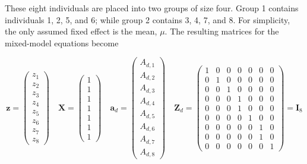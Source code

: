 \documentclass{article}
\begin{document}
These eight individuals are placed into two groups of size four. Group 1 contains individuals 1, 2, 5, and 6; while group 2 contains 3, 4, 7, and 8. For simplicity, the only assumed fixed effect is the mean,  $ \mu $. The resulting matrices for the mixed-model equations become

\begin{equation}
\mathbf{z}=\begin{pmatrix}{{{z_{1}}}} \\{{{z_{2}}}} \\{{{z_{3}}}} \\{{{z_{4}}}} \\{{{z_{5}}}} \\{{{z_{6}}}} \\{{{z_{7}}}} \\{{{z_{8}}}}\end{pmatrix}\quad\mathbf{X}=\begin{pmatrix}{{{1}}} \\{{{1}}} \\{{{1}}} \\{{{1}}} \\{{{1}}} \\{{{1}}} \\{{{1}}}\end{pmatrix}\quad\mathbf{a}_{d}=\begin{pmatrix}{{{A_{d,1}}}} \\{{{A_{d,2}}}} \\{{{A_{d,3}}}} \\{{{A_{d,4}}}} \\{{{A_{d,5}}}} \\{{{A_{d,6}}}} \\{{{A_{d,7}}}} \\{{{A_{d,8}}}}\end{pmatrix}\quad\mathbf{Z}_{d}=\begin{pmatrix}{{{1}}}&{{{0}}}&{{{0}}}&{{{0}}}&{{{0}}}&{{{0}}}&{{{0}}} \\{{{0}}}&{{{1}}}&{{{0}}}&{{{0}}}&{{{0}}}&{{{0}}}&{{{0}}} \\{{{0}}}&{{{0}}}&{{{1}}}&{{{0}}}&{{{0}}}&{{{0}}}&{{{0}}} \\{{{0}}}&{{{0}}}&{{{0}}}&{{{1}}}&{{{0}}}&{{{0}}}&{{{0}}} \\{{{0}}}&{{{0}}}&{{{0}}}&{{{1}}}&{{{0}}}&{{{0}}}&{{{0}}} \\{{{0}}}&{{{0}}}&{{{0}}}&{{{0}}}&{{{1}}}&{{{0}}}&{{{0}}} \\{{{0}}}&{{{0}}}&{{{0}}}&{{{0}}}&{{{0}}}&{{{1}}}&{{{0}}} \\{{{0}}}&{{{0}}}&{{{0}}}&{{{0}}}&{{{0}}}&{{{1}}}&{{{0}}} \\{{{0}}}&{{{0}}}&{{{0}}}&{{{0}}}&{{{0}}}&{{{0}}}&{{{1}}}\end{pmatrix}=\mathbf{I}_{8}
\end{equation}
\end{document}
